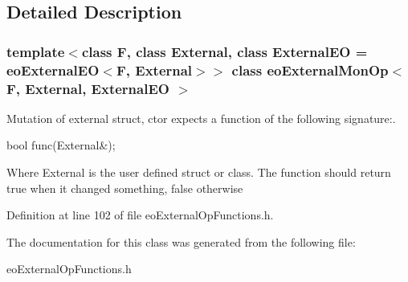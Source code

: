 \subsection{Detailed Description}
\subsubsection*{template$<$class F, class External, class External\-EO = eo\-External\-EO$<$F, External$>$$>$ class eo\-External\-Mon\-Op$<$ F, External, External\-EO $>$}

Mutation of external struct, ctor expects a function of the following signature:. 

bool func(External\&);

Where External is the user defined struct or class. The function should return true when it changed something, false otherwise 



Definition at line 102 of file eo\-External\-Op\-Functions.h.

The documentation for this class was generated from the following file:\begin{CompactItemize}
\item 
eo\-External\-Op\-Functions.h\end{CompactItemize}
